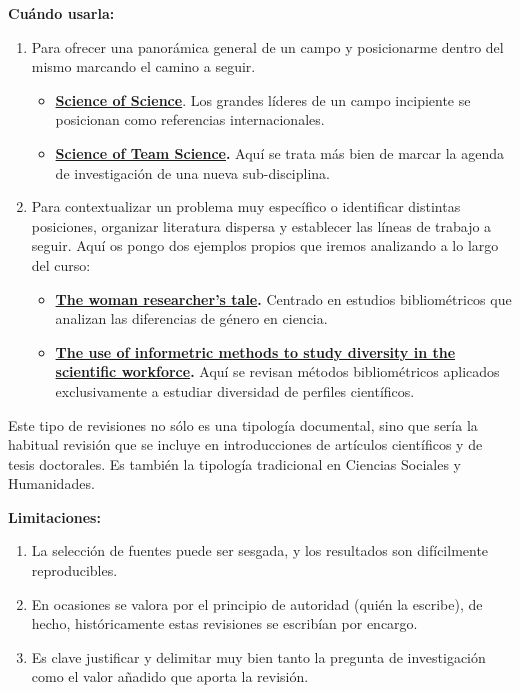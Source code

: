 \documentclass[
]{book}
\providecommand{\tightlist}{%
  \setlength{\itemsep}{0pt}\setlength{\parskip}{0pt}}
\begin{document}
\textbf{Cuándo usarla:}

\begin{enumerate}
\def\labelenumi{\arabic{enumi}.}
\tightlist
\item
  Para ofrecer una panorámica general de un campo y posicionarme dentro del mismo marcando el camino a seguir.

  \begin{itemize}
  \item
    \href{https://doi.org/10.1126/science.aao0185}{\textbf{Science of Science}}. Los grandes líderes de un campo incipiente se posicionan como referencias internacionales.
  \item
    \href{https://psycnet.apa.org/doi/10.1037/amp0000319}{\textbf{Science of Team Science}}\textbf{.} Aquí se trata más bien de marcar la agenda de investigación de una nueva sub-disciplina.
  \end{itemize}
\item
  Para contextualizar un problema muy específico o identificar distintas posiciones, organizar literatura dispersa y establecer las líneas de trabajo a seguir. Aquí os pongo dos ejemplos propios que iremos analizando a lo largo del curso:

  \begin{itemize}
  \item
    \href{https://doi.org/10.1002/asi.25012}{\textbf{The woman researcher's tale}}\textbf{.} Centrado en estudios bibliométricos que analizan las diferencias de género en ciencia.
  \item
    \href{https://doi.org/10.1162/qss_a_00367}{\textbf{The use of informetric methods to study diversity in the scientific workforce}}\textbf{.} Aquí se revisan métodos bibliométricos aplicados exclusivamente a estudiar diversidad de perfiles científicos.
  \end{itemize}
\end{enumerate}

Este tipo de revisiones no sólo es una tipología documental, sino que sería la habitual revisión que se incluye en introducciones de artículos científicos y de tesis doctorales. Es también la tipología tradicional en Ciencias Sociales y Humanidades.

\textbf{Limitaciones:}

\begin{enumerate}
\def\labelenumi{\arabic{enumi}.}
\tightlist
\item
  La selección de fuentes puede ser sesgada, y los resultados son difícilmente reproducibles.
\item
  En ocasiones se valora por el principio de autoridad (quién la escribe), de hecho, históricamente estas revisiones se escribían por encargo.
\item
  Es clave justificar y delimitar muy bien tanto la pregunta de investigación como el valor añadido que aporta la revisión.
\end{enumerate}
\end{document}
